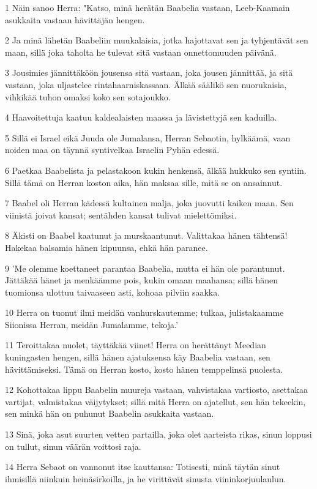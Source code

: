 \par 1 Näin sanoo Herra: "Katso, minä herätän Baabelia vastaan, Leeb-Kaamain asukkaita vastaan hävittäjän hengen.
\par 2 Ja minä lähetän Baabeliin muukalaisia, jotka hajottavat sen ja tyhjentävät sen maan, sillä joka taholta he tulevat sitä vastaan onnettomuuden päivänä.
\par 3 Jousimies jännittäköön jousensa sitä vastaan, joka jousen jännittää, ja sitä vastaan, joka uljastelee rintahaarniskassaan. Älkää säälikö sen nuorukaisia, vihkikää tuhon omaksi koko sen sotajoukko.
\par 4 Haavoitettuja kaatuu kaldealaisten maassa ja lävistettyjä sen kaduilla.
\par 5 Sillä ei Israel eikä Juuda ole Jumalansa, Herran Sebaotin, hylkäämä, vaan noiden maa on täynnä syntivelkaa Israelin Pyhän edessä.
\par 6 Paetkaa Baabelista ja pelastakoon kukin henkensä, älkää hukkuko sen syntiin. Sillä tämä on Herran koston aika, hän maksaa sille, mitä se on ansainnut.
\par 7 Baabel oli Herran kädessä kultainen malja, joka juovutti kaiken maan. Sen viinistä joivat kansat; sentähden kansat tulivat mielettömiksi.
\par 8 Äkisti on Baabel kaatunut ja murskaantunut. Valittakaa hänen tähtensä! Hakekaa balsamia hänen kipuunsa, ehkä hän paranee.
\par 9 'Me olemme koettaneet parantaa Baabelia, mutta ei hän ole parantunut. Jättäkää hänet ja menkäämme pois, kukin omaan maahansa; sillä hänen tuomionsa ulottuu taivaaseen asti, kohoaa pilviin saakka.
\par 10 Herra on tuonut ilmi meidän vanhurskautemme; tulkaa, julistakaamme Siionissa Herran, meidän Jumalamme, tekoja.'
\par 11 Teroittakaa nuolet, täyttäkää viinet! Herra on herättänyt Meedian kuningasten hengen, sillä hänen ajatuksensa käy Baabelia vastaan, sen hävittämiseksi. Tämä on Herran kosto, kosto hänen temppelinsä puolesta.
\par 12 Kohottakaa lippu Baabelin muureja vastaan, vahvistakaa vartiosto, asettakaa vartijat, valmistakaa väijytykset; sillä mitä Herra on ajatellut, sen hän tekeekin, sen minkä hän on puhunut Baabelin asukkaita vastaan.
\par 13 Sinä, joka asut suurten vetten partailla, joka olet aarteista rikas, sinun loppusi on tullut, sinun väärän voittosi raja.
\par 14 Herra Sebaot on vannonut itse kauttansa: Totisesti, minä täytän sinut ihmisillä niinkuin heinäsirkoilla, ja he virittävät sinusta viininkorjuulaulun.
